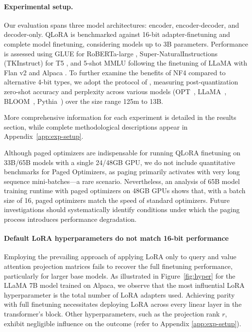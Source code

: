 \paragraph{Experimental setup.} Our evaluation spans three model architectures: encoder, encoder-decoder, and decoder-only. QLoRA is benchmarked against 16-bit adapter-finetuning and complete model finetuning, considering models up to 3B parameters. Performance is assessed using GLUE \citep{wang2018glue} for RoBERTa-large \citep{liu2019roberta}, Super-NaturalInstructions (TKInstruct) \citep{wang2022super} for T5 \citep{t5}, and 5-shot MMLU \citep{hendrycksmeasuring} following the finetuning of LLaMA with Flan v2 \citep{longpre2023flan} and Alpaca \citep{alpaca}. To further examine the benefits of NF4 compared to alternative 4-bit types, we adopt the protocol of \citet{dettmers2022case}, measuring post-quantization zero-shot accuracy and perplexity across various models (OPT~\citep{zhang2022opt}, LLaMA~\citep{touvron2023llama}, BLOOM~\citep{scao2022bloom}, Pythia~\citep{biderman2023pythia}) over the size range 125m to 13B. 

More comprehensive information for each experiment is detailed in the results section, while complete methodological descriptions appear in Appendix~\ref{app:exp-setup}.

Although paged optimizers are indispensable for running \textsc{QLoRA} finetuning on 33B/65B models with a single 24/48GB GPU, we do not include quantitative benchmarks for Paged Optimizers, as paging primarily activates with very long sequence mini-batches—a rare scenario. Nevertheless, an analysis of 65B model training runtime with paged optimizers on 48GB GPUs shows that, with a batch size of 16, paged optimizers match the speed of standard optimizers. Future investigations should systematically identify conditions under which the paging process introduces performance degradation.

\paragraph{Default LoRA hyperparameters do not match 16-bit performance}

Employing the prevailing approach of applying LoRA only to query and value attention projection matrices \citep{hu2021lora} fails to recover the full finetuning performance, particularly for larger base models. As illustrated in Figure~\ref{fig:hyper} for the LLaMA 7B model trained on Alpaca, we observe that the most influential LoRA hyperparameter is the total number of LoRA adapters used. Achieving parity with full finetuning necessitates deploying LoRA across every linear layer in the transformer's block. Other hyperparameters, such as the projection rank $r$, exhibit negligible influence on the outcome (refer to Appendix \ref{app:exp-setup}).

